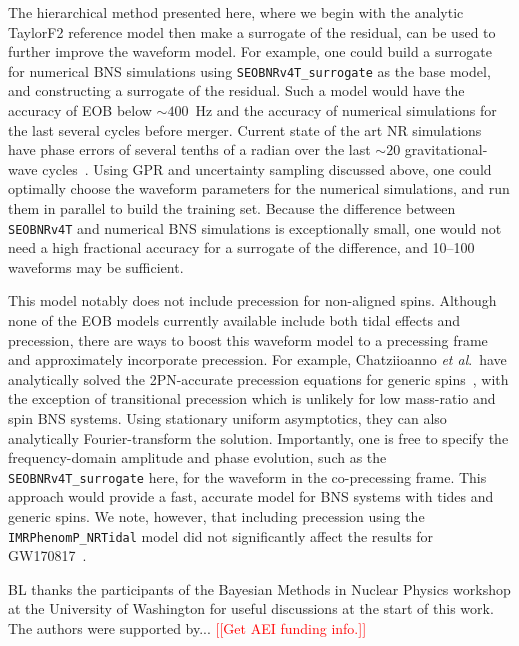 \documentclass[prd,aps,letter,twocolumn,floatfix,notitlepage,nofootinbib]{revtex4-1}
\newcommand{\red}[1]{\textcolor{red}{#1}}
\begin{document}
The hierarchical method presented here, where we begin with the analytic TaylorF2 reference model then make a surrogate of the residual, can be used to further improve the waveform model. For example, one could build a surrogate for numerical BNS simulations using \texttt{SEOBNRv4T\_surrogate} as the base model, and constructing a surrogate of the residual. Such a model would have the accuracy of EOB below $\sim 400$~Hz and the accuracy of numerical simulations for the last several cycles before merger. Current state of the art NR simulations have phase errors of several tenths of a radian over the last $\sim 20$ gravitational-wave cycles~\cite{DietrichHinderer2017, KiuchiKawaguchiKyutoku2017}. Using GPR and uncertainty sampling discussed above, one could optimally choose the waveform parameters for the numerical simulations, and run them in parallel to build the training set. Because the difference between \texttt{SEOBNRv4T} and numerical BNS simulations is exceptionally small, one would not need a high fractional accuracy for a surrogate of the difference, and 10--100 waveforms may be sufficient.

This model notably does not include precession for non-aligned spins. Although none of the EOB models currently available include both tidal effects and precession, there are ways to boost this waveform model to a precessing frame and approximately incorporate precession. For example, Chatziioanno {\it et al}.\ have analytically solved the 2PN-accurate precession equations for generic spins~\cite{ChatziioannouKleinCornish2017a, ChatziioannouKleinCornish2017b}, with the exception of transitional precession which is unlikely for low mass-ratio and spin BNS systems. Using stationary uniform asymptotics, they can also analytically Fourier-transform the solution. Importantly, one is free to specify the frequency-domain amplitude and phase evolution, such as the \texttt{SEOBNRv4T\_surrogate} here, for the waveform in the co-precessing frame. This approach would provide a fast, accurate model for BNS systems with tides and generic spins. We note, however, that including precession using the \texttt{IMRPhenomP\_NRTidal} model did not significantly affect the results for GW170817~\cite{BNSPE}.


\begin{acknowledgments}

BL thanks the participants of the Bayesian Methods in Nuclear Physics workshop at the University of Washington for useful discussions at the start of this work. The authors were supported by... \red{[[Get AEI funding info.]]}

\end{acknowledgments}
\end{document}

